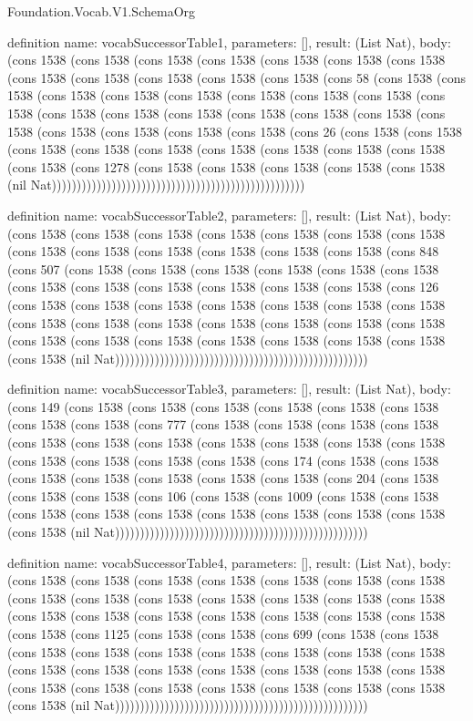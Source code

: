 \begin{lexlean}{Foundation.Vocab.V1.SchemaOrg}
\begin{semanticmodule}
definition{
  name: vocabSuccessorTable1,
  parameters: [],
  result: (List Nat),
  body: (cons 1538 (cons 1538 (cons 1538 (cons 1538 (cons 1538 (cons 1538 (cons 1538 (cons 1538 (cons 1538 (cons 1538 (cons 1538 (cons 1538 (cons 58 (cons 1538 (cons 1538 (cons 1538 (cons 1538 (cons 1538 (cons 1538 (cons 1538 (cons 1538 (cons 1538 (cons 1538 (cons 1538 (cons 1538 (cons 1538 (cons 1538 (cons 1538 (cons 1538 (cons 1538 (cons 1538 (cons 1538 (cons 1538 (cons 26 (cons 1538 (cons 1538 (cons 1538 (cons 1538 (cons 1538 (cons 1538 (cons 1538 (cons 1538 (cons 1538 (cons 1538 (cons 1278 (cons 1538 (cons 1538 (cons 1538 (cons 1538 (cons 1538 (nil Nat)))))))))))))))))))))))))))))))))))))))))))))))))))
}

definition{
  name: vocabSuccessorTable2,
  parameters: [],
  result: (List Nat),
  body: (cons 1538 (cons 1538 (cons 1538 (cons 1538 (cons 1538 (cons 1538 (cons 1538 (cons 1538 (cons 1538 (cons 1538 (cons 1538 (cons 1538 (cons 1538 (cons 848 (cons 507 (cons 1538 (cons 1538 (cons 1538 (cons 1538 (cons 1538 (cons 1538 (cons 1538 (cons 1538 (cons 1538 (cons 1538 (cons 1538 (cons 1538 (cons 126 (cons 1538 (cons 1538 (cons 1538 (cons 1538 (cons 1538 (cons 1538 (cons 1538 (cons 1538 (cons 1538 (cons 1538 (cons 1538 (cons 1538 (cons 1538 (cons 1538 (cons 1538 (cons 1538 (cons 1538 (cons 1538 (cons 1538 (cons 1538 (cons 1538 (cons 1538 (nil Nat)))))))))))))))))))))))))))))))))))))))))))))))))))
}

definition{
  name: vocabSuccessorTable3,
  parameters: [],
  result: (List Nat),
  body: (cons 149 (cons 1538 (cons 1538 (cons 1538 (cons 1538 (cons 1538 (cons 1538 (cons 1538 (cons 1538 (cons 777 (cons 1538 (cons 1538 (cons 1538 (cons 1538 (cons 1538 (cons 1538 (cons 1538 (cons 1538 (cons 1538 (cons 1538 (cons 1538 (cons 1538 (cons 1538 (cons 1538 (cons 1538 (cons 174 (cons 1538 (cons 1538 (cons 1538 (cons 1538 (cons 1538 (cons 1538 (cons 1538 (cons 204 (cons 1538 (cons 1538 (cons 1538 (cons 106 (cons 1538 (cons 1009 (cons 1538 (cons 1538 (cons 1538 (cons 1538 (cons 1538 (cons 1538 (cons 1538 (cons 1538 (cons 1538 (cons 1538 (nil Nat)))))))))))))))))))))))))))))))))))))))))))))))))))
}

definition{
  name: vocabSuccessorTable4,
  parameters: [],
  result: (List Nat),
  body: (cons 1538 (cons 1538 (cons 1538 (cons 1538 (cons 1538 (cons 1538 (cons 1538 (cons 1538 (cons 1538 (cons 1538 (cons 1538 (cons 1538 (cons 1538 (cons 1538 (cons 1538 (cons 1538 (cons 1538 (cons 1538 (cons 1538 (cons 1538 (cons 1538 (cons 1538 (cons 1125 (cons 1538 (cons 1538 (cons 699 (cons 1538 (cons 1538 (cons 1538 (cons 1538 (cons 1538 (cons 1538 (cons 1538 (cons 1538 (cons 1538 (cons 1538 (cons 1538 (cons 1538 (cons 1538 (cons 1538 (cons 1538 (cons 1538 (cons 1538 (cons 1538 (cons 1538 (cons 1538 (cons 1538 (cons 1538 (cons 1538 (cons 1538 (nil Nat)))))))))))))))))))))))))))))))))))))))))))))))))))
}


\end{semanticmodule}
\end{lexlean}
